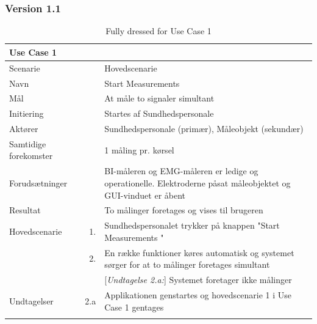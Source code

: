 \subsubsection{Version 1.1} 
\begin{longtabu} to  %
	{\large \textbf{Use Case 1 }} && \\
	\toprule
	Scenarie 				&&	Hovedscenarie\\
	Navn 					&& 	Start Measurements\\
	Mål 					&& 	At måle to signaler simultant \\
	Initiering 				&& 	Startes af Sundhedspersonale\\
	Aktører 				&& 	Sundhedspersonale (primær), Måleobjekt (sekundær)\\
	
	Samtidige forekomster  	&& 	1 måling pr. kørsel \\
	Forudsætninger 			&&	BI-måleren og EMG-måleren er ledige og operationelle. Elektroderne påsat måleobjektet og GUI-vinduet er åbent \\ 
	Resultat 				&& 	To målinger foretages og vises til brugeren\\ \midrule
	Hovedscenarie 			&    1. 	&	Sundhedspersonalet trykker på knappen "Start Measurements "\\				 	
							&    2. 	& 	En række funktioner køres automatisk og systemet sørger for at to målinger foretages simultant\\
	
	
	&&[\textit{Undtagelse 2.a:}] Systemet foretager ikke målinger\\ \midrule						
							
							
	Undtagelser 			&		2.a	& 	Applikationen genstartes og hovedscenarie 1 i Use Case 1 gentages \\ \bottomrule
	
	\caption{Fully dressed for Use Case 1}
	\label{UC1}
\end{longtabu}




